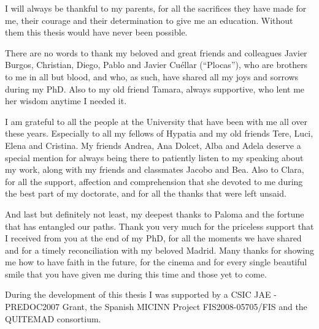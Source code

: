 \medskip

I will always be thankful to my parents, for all the sacrifices they have made for me, their courage and their determination to give me an education. Without them this thesis would have never been possible.
 
 \medskip
 
 There are no words to thank my beloved and great friends and colleagues Javier Burgos, Christian, Diego, Pablo and Javier Cu\'ellar (``Plocas''), who are  brothers to me in all but blood, and who, as such, have shared all my joys and sorrows during my PhD. Also to my old friend Tamara, always supportive, who lent me her wisdom anytime I needed it.
 
\medskip
 
I am grateful to all the people at the University that have been with me all over these years. Especially to all my fellows of Hypatia and my old friends  Tere, Luci, Elena and Cristina. My friends Andrea, Ana Dolcet, Alba and Adela deserve  a special mention for always being there to patiently listen to my speaking about my work, along with my friends and classmates Jacobo and Bea. Also to Clara, for all the support, affection and comprehension that she devoted to me during the best part of my doctorate, and for all the thanks that were left unsaid.

\medskip

And last but definitely not least, my deepest thanks to Paloma and the fortune that has entangled our paths. Thank you very much for the priceless support that I received from you at the end of my PhD, for all the moments we have shared and for a timely reconciliation with my beloved Madrid. Many thanks for showing me how to have faith in the future, for the cinema and for every single beautiful smile that you have given me during this time and those yet to come.

\medskip

During the development of this thesis I was supported by a CSIC JAE - PREDOC2007 Grant, the Spanish MICINN Project FIS2008-05705/FIS  and the QUITEMAD consortium.

\thispagestyle{empty}
